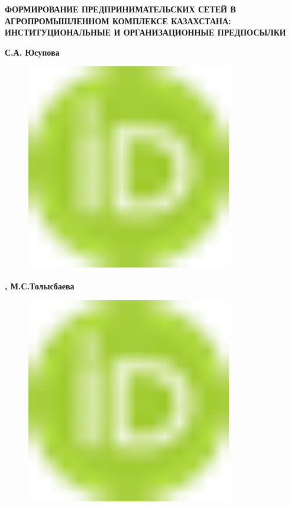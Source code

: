 
{\bfseries ФОРМИРОВАНИЕ ПРЕДПРИНИМАТЕЛЬСКИХ СЕТЕЙ В АГРОПРОМЫШЛЕННОМ
КОМПЛЕКСЕ КАЗАХСТАНА: ИНСТИТУЦИОНАЛЬНЫЕ И ОРГАНИЗАЦИОННЫЕ ПРЕДПОСЫЛКИ}

{\bfseries С.А.
Юсупова}
\begin{figure}[H]
	\centering
	\includegraphics[width=0.8\textwidth]{media/ekon2/image1}
	\caption*{}
\end{figure}
{\bfseries \textsuperscript{\envelope },
М.С.Толысбаева}
\begin{figure}[H]
	\centering
	\includegraphics[width=0.8\textwidth]{media/ekon2/image1}
	\caption*{}
\end{figure}
